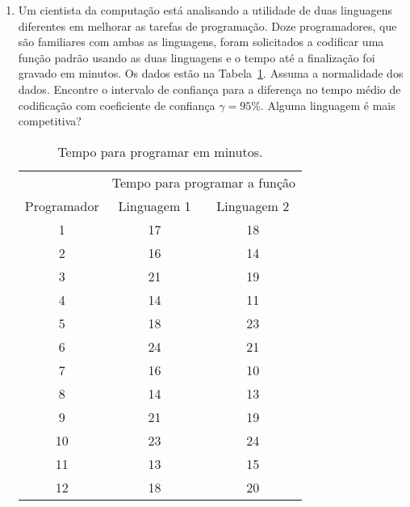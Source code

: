 \documentclass[8pt, a4paper]{article}
\begin{document}
\begin{enumerate}
	\item Um cientista da computação está analisando a utilidade de duas linguagens diferentes em melhorar as tarefas de programação. Doze programadores, que são familiares com ambas as linguagens, foram solicitados a codificar uma função padrão usando as duas linguagens e o tempo até a finalização foi gravado em minutos. Os dados estão na Tabela~\ref{tab:tempo-programacao}. Assuma a normalidade dos dados. Encontre o intervalo de confiança para a diferença no tempo médio de codificação com coeficiente de confiança $\gamma = 95\%$. Alguma linguagem é mais competitiva?
	\begin{table}[ht]
		\centering
		\begin{tabular}{c|cc}
			\toprule[0.05cm]
			 & \multicolumn{2}{|c}{Tempo para programar a função}\\ \cmidrule[0.025cm]{2-3}
			Programador & Linguagem 1 & Linguagem 2 \\ 
			\midrule[0.025cm]
			1 & 17 & 18 \\ 
			2 & 16 & 14 \\ 
			3 & 21 & 19 \\ 
			4 & 14 & 11 \\ 
			5 & 18 & 23 \\ 
			6 & 24 & 21 \\ 
			7 & 16 & 10 \\ 
			8 & 14 & 13 \\ 
			9 & 21 & 19 \\ 
			10 & 23 & 24 \\ 
			11 & 13 & 15 \\ 
			12 & 18 & 20 \\ 
			\bottomrule[0.05cm]
		\end{tabular}
		\caption{Tempo para programar em minutos.} 
		\label{tab:tempo-programacao}
	\end{table}


\end{enumerate}
\end{document}
